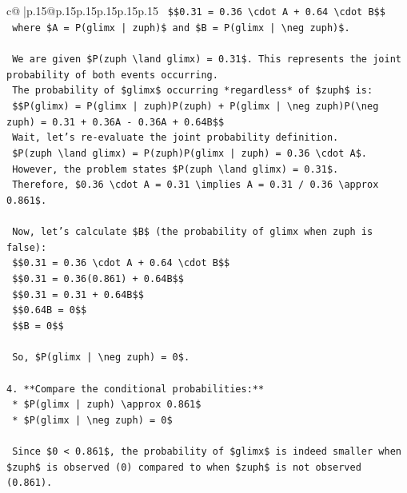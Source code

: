 \documentclass{article}
\begin{document}
{\begin{supertabular}{c@{$\;$}|p{.15\linewidth}@{}p{.15\linewidth}p{.15\linewidth}p{.15\linewidth}p{.15\linewidth}p{.15\linewidth}}
{{{\texttt{    \$\$0.31 = 0.36 \textbackslash{}cdot A + 0.64 \textbackslash{}cdot B\$\$} \\
\texttt{    where \$A = P(glimx | zuph)\$ and \$B = P(glimx | \textbackslash{}neg zuph)\$.} \\
\\ 
\texttt{    We are given \$P(zuph \textbackslash{}land glimx) = 0.31\$. This represents the joint probability of both events occurring.} \\
\texttt{    The probability of \$glimx\$ occurring *regardless* of \$zuph\$ is:} \\
\texttt{    \$\$P(glimx) = P(glimx | zuph)P(zuph) + P(glimx | \textbackslash{}neg zuph)P(\textbackslash{}neg zuph) = 0.31 + 0.36A {-} 0.36A + 0.64B\$\$} \\
\texttt{    Wait, let's re{-}evaluate the joint probability definition.} \\
\texttt{    \$P(zuph \textbackslash{}land glimx) = P(zuph)P(glimx | zuph) = 0.36 \textbackslash{}cdot A\$.} \\
\texttt{    However, the problem states \$P(zuph \textbackslash{}land glimx) = 0.31\$.} \\
\texttt{    Therefore, \$0.36 \textbackslash{}cdot A = 0.31 \textbackslash{}implies A = 0.31 / 0.36 \textbackslash{}approx 0.861\$.} \\
\\ 
\texttt{    Now, let's calculate \$B\$ (the probability of glimx when zuph is false):} \\
\texttt{    \$\$0.31 = 0.36 \textbackslash{}cdot A + 0.64 \textbackslash{}cdot B\$\$} \\
\texttt{    \$\$0.31 = 0.36(0.861) + 0.64B\$\$} \\
\texttt{    \$\$0.31 = 0.31 + 0.64B\$\$} \\
\texttt{    \$\$0.64B = 0\$\$} \\
\texttt{    \$\$B = 0\$\$} \\
\\ 
\texttt{    So, \$P(glimx | \textbackslash{}neg zuph) = 0\$.} \\
\\ 
\texttt{4.  **Compare the conditional probabilities:**} \\
\texttt{    *   \$P(glimx | zuph) \textbackslash{}approx 0.861\$} \\
\texttt{    *   \$P(glimx | \textbackslash{}neg zuph) = 0\$} \\
\\ 
\texttt{    Since \$0 < 0.861\$, the probability of \$glimx\$ is indeed smaller when \$zuph\$ is observed (0) compared to when \$zuph\$ is not observed (0.861).} \\
}}}
\end{supertabular}}
\end{document}
